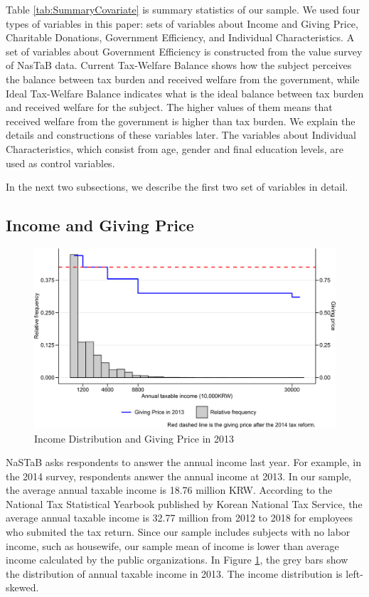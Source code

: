 \documentclass[ review  , 3p ]{elsarticle}
\begin{document}
  Table \ref{tab:SummaryCovariate} is summary statistics of our sample.
  We used four types of variables in this paper:
  sets of variables about Income and Giving Price,
  Charitable Donations,
  Government Efficiency,
  and Individual Characteristics.
  A set of variables about Government Efficiency is constructed from the value survey of NasTaB data.
  Current Tax-Welfare Balance shows how the subject perceives the balance between tax burden and received welfare from the government,
  while Ideal Tax-Welfare Balance indicates what is the ideal balance between tax burden and received welfare for the subject.
  The higher values of them means that received welfare from the government is higher than tax burden.
  We explain the details and constructions of these variables later.
  The variables about Individual Characteristics,
  which consist from age, gender and final education levels, are used as control variables.

  In the next two subsections,
  we describe the first two set of variables in detail.

  \hypertarget{income-and-giving-price}{%
  \subsection{Income and Giving Price}\label{income-and-giving-price}}

  \begin{figure}[t]

  {\centering \includegraphics[width=0.9\linewidth]{draft_files/figure-latex/SummaryPriceChange-1} 

  }

  \caption{Income Distribution and Giving Price in 2013}\label{fig:SummaryPriceChange}
  \end{figure}

  NaSTaB asks respondents to answer the annual income last year.
  For example, in the 2014 survey, respondents answer the annual income at 2013.
  In our sample, the average annual taxable income is 18.76 million KRW.
  According to the National Tax Statistical Yearbook published by Korean National Tax Service,
  the average annual taxable income is 32.77 million from 2012 to 2018
  for employees who submited the tax return.
  Since our sample includes subjects with no labor income, such as housewife,
  our sample mean of income is lower than average income calculated by the public organizations.
  In Figure \ref{fig:SummaryPriceChange},
  the grey bars show the distribution of annual taxable income in 2013.
  The income distribution is left-skewed.
\end{document}

